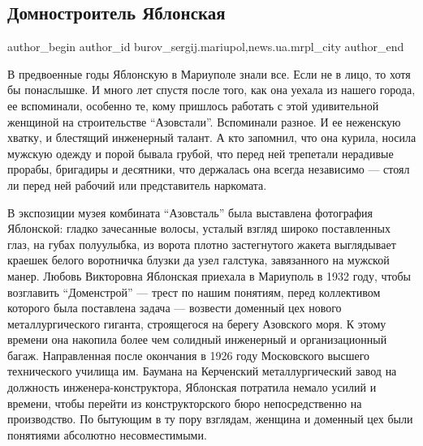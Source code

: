  
 
 
 
 
 
\subsection{Домностроитель Яблонская}
\label{sec:13_08_2017.stz.news.ua.mrpl_city.1.domnostroitel_jablonskaja}
 
\ifcmt
 author_begin
   author_id burov_sergij.mariupol,news.ua.mrpl_city
 author_end
\fi


В предвоенные годы Яблонскую в Мариуполе знали все. Если не в лицо, то хотя бы
понаслышке. И много лет спустя после того, как она уехала из нашего города, ее
вспоминали, особенно те, кому пришлось работать с этой удивительной женщиной на
строительстве \enquote{Азовстали}. Вспоминали разное. И ее неженскую хватку, и
блестящий инженерный талант. А кто запомнил, что она курила, носила мужскую
одежду и порой бывала грубой, что перед ней трепетали нерадивые прорабы,
бригадиры и десятники, что держалась она всегда независимо — стоял ли перед ней
рабочий или представитель наркомата.


В экспозиции музея комбината \enquote{Азовсталь} была выставлена фотография Яблонской:
гладко зачесанные волосы, усталый взгляд широко поставленных глаз, на губах
полуулыбка, из ворота плотно застегнутого жакета выглядывает краешек белого
воротничка блузки да узел галстука, завязанного на мужской манер. Любовь
Викторовна Яблонская приехала в Мариуполь в 1932 году, чтобы возглавить
\enquote{Доменстрой} — трест по нашим понятиям, перед коллективом которого была
поставлена задача — возвести доменный цех нового металлургического гиганта,
строящегося на берегу Азовского моря. К этому времени она накопила более чем
солидный инженерный и организационный багаж. Направленная после окончания в
1926 году Московского высшего технического училища им. Баумана на Керченский
металлургический завод на должность инженера-конструктора, Яблонская потратила
немало усилий и времени, чтобы перейти из конструкторского бюро непосредственно
на производство. По бытующим в ту пору взглядам, женщина и доменный цех были
понятиями абсолютно несовместимыми.

